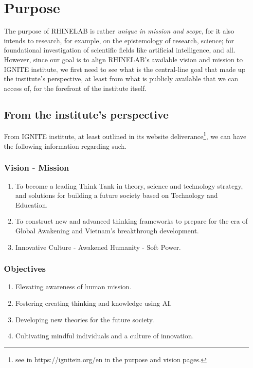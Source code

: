 \documentclass[10pt,a4paper]{article}
\begin{document}
\section{Purpose}

The purpose of RHINELAB is rather \textit{unique in mission and scope}, for it also intends to research, for example, on the epistemology of research, science; for foundational investigation of scientific fields like artificial intelligence, and all. However, since our goal is to align RHINELAB's available vision and mission to IGNITE institute, we first need to see what is the central-line goal that made up the institute's perspective, at least from what is publicly available that we can access of, for the forefront of the institute itself. 

\subsection{From the institute's perspective}

From IGNITE institute, at least outlined in its website deliverance\footnote{see in https://ignitein.org/en in the purpose and vision pages.}, we can have the following information regarding such. 

\subsubsection{Vision - Mission}

\begin{enumerate}[itemsep=1pt,topsep=1pt]
    \item To become a leading Think Tank in theory, science and technology strategy, and solutions for building a future society based on Technology and Education.
    \item To construct new and advanced thinking frameworks to prepare for the era of Global Awakening and Vietnam's breakthrough development.
    \item Innovative Culture - Awakened Humanity - Soft Power.
\end{enumerate}

\subsubsection{Objectives}
\begin{enumerate}[topsep=0pt,itemsep=0pt]
    \item Elevating awareness of human mission. 
    \item Fostering creating thinking and knowledge using AI. 
    \item Developing new theories for the future society. 
    \item Cultivating mindful individuals and a culture of innovation. 
\end{enumerate}
\end{document}
